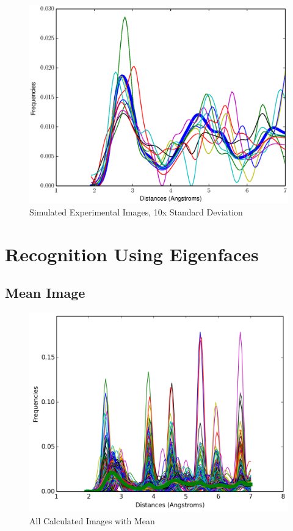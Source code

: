 \documentclass[12pt,letterpaper]{article}
\begin{document}
\begin{figure}[ht]
  \begin{center}
    \includegraphics[scale=0.8]{figs/RandomImgs10x.eps}
    \caption{Simulated Experimental Images, 10x Standard Deviation}
  \end{center}
\end{figure}
\clearpage

\section{Recognition Using Eigenfaces}
\subsection{Mean Image}
\begin{figure}[ht]
  \begin{center}
    \includegraphics[scale=0.8]{figs/all_calc_images_mean.png}
    \caption{All Calculated Images with Mean}
  \end{center}
\end{figure}
\clearpage
\end{document}
